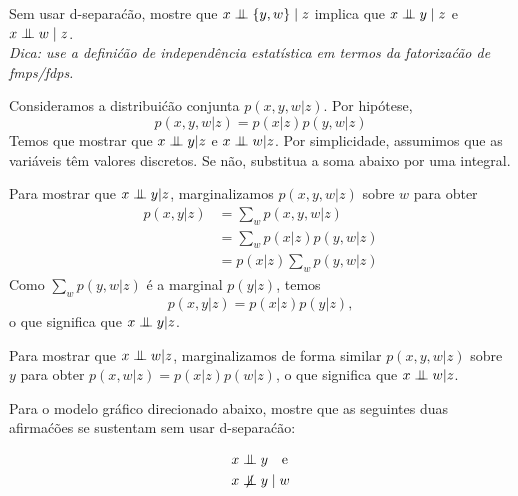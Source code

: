 \begin{exenumerate}
    \item Sem usar d-separa\'c\~ao, mostre que $x \mathrel{\perp\mspace{-10mu}\perp} \{y,w\} \mid z$ implica que $x \mathrel{\perp\mspace{-10mu}\perp} y \mid z$ e $x \mathrel{\perp\mspace{-10mu}\perp} w \mid z$.\\
    \emph{Dica: use a defini\'c\~ao de independ\^encia estat\'istica em termos da fatoriza\'c\~ao de fmps/fdps.}
    
    \begin{loesung}
        Consideramos a distribui\'c\~ao conjunta $p(x,y,w | z)$. Por hip\'otese,
        \begin{equation}
            p(x,y,w | z) = p(x |z) p(y,w | z)
        \end{equation}
        Temos que mostrar que $x \mathrel{\perp\mspace{-10mu}\perp} y| z$ e $x \mathrel{\perp\mspace{-10mu}\perp} w | z$. Por simplicidade, assumimos que as vari\'aveis t\^em valores discretos. Se n\~ao, substitua a soma abaixo por uma integral.
        
        Para mostrar que $x \mathrel{\perp\mspace{-10mu}\perp} y| z$, marginalizamos $p(x,y,w | z)$
        sobre $w$ para obter
        \begin{align}
            p(x,y | z ) & = \sum_w p(x,y,w | z) \\
            & = \sum_w  p(x |z) p(y,w | z) \\
            & = p(x | z) \sum_w p(y,w | z)
        \end{align}
        Como $\sum_w p(y,w | z)$ \'e a marginal $p(y |z)$, temos
        \begin{equation}
            p(x,y | z ) =  p(x | z) p(y | z),
        \end{equation}
        o que significa que $x \mathrel{\perp\mspace{-10mu}\perp} y | z$.
        
        Para mostrar que $x \mathrel{\perp\mspace{-10mu}\perp} w| z$, marginalizamos de forma similar
        $p(x,y,w | z)$ sobre $y$ para obter $p(x,w | z) =
        p(x|z) p(w |z)$, o que significa que $x \mathrel{\perp\mspace{-10mu}\perp} w | z$.
        
    \end{loesung}
    
    
    \item Para o modelo gr\'afico direcionado abaixo, mostre que as seguintes duas afirma\'c\~oes se sustentam sem usar d-separa\'c\~ao:
    
    \begin{align}
        &x \independent y \quad \text{e} \label{eq:statement1-alt} \\
        &x \notind y \mid w \label{eq:statement2-alt}
    \end{align}
    

\end{exenumerate}
